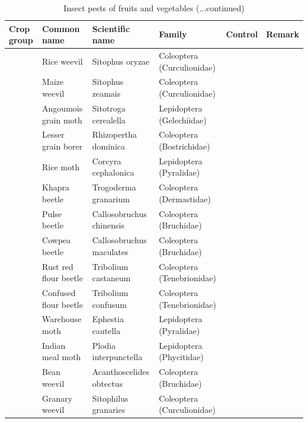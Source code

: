 \documentclass[10pt,dvipsnames,ignorenonframetext,aspectratio=169]{beamer}
\begin{document}
\begin{frame}{}
\protect\hypertarget{section-22}{}
\begin{table}

\caption{\label{tab:unnamed-chunk-4}Insect pests of fruits and vegetables (...continued)}
\centering
\fontsize{5}{7}\selectfont
\begin{tabular}[t]{>{\raggedright\arraybackslash}p{6em}>{\raggedright\arraybackslash}p{12em}>{\raggedright\arraybackslash}p{14em}>{\raggedright\arraybackslash}p{14em}>{\raggedright\arraybackslash}p{8em}>{\raggedright\arraybackslash}p{8em}}
\toprule
Crop group & Common name & Scientific name & Family & Control & Remark\\
\midrule
 & Rice weevil & Sitophus oryzae & Coleoptera (Curculionidae) &  & \\
\cmidrule{2-6}
 & Maize weevil & Sitophus zeamais & Coleoptera (Curculionidae) &  & \\
\cmidrule{2-6}
 & Angoumois grain moth & Sitotroga cerealella & Lepidoptera (Gelechiidae) &  & \\
\cmidrule{2-6}
 & Lesser grain borer & Rhizopertha dominica & Coleoptera (Bostrichidae) &  & \\
\cmidrule{2-6}
 & Rice moth & Corcyra cephalonica & Lepidoptera (Pyralidae) &  & \\
\cmidrule{2-6}
 & Khapra beetle & Trogoderma granarium & Coleoptera (Dermastidae) &  & \\
\cmidrule{2-6}
 & Pulse beetle & Callosobruchus chinensis & Coleoptera (Bruchidae) &  & \\
\cmidrule{2-6}
 & Cowpea beetle & Callosobruchus maculates & Coleoptera (Bruchidae) &  & \\
\cmidrule{2-6}
 & Rust red flour beetle & Tribolium castaneum & Coleoptera (Tenebrionidae) &  & \\
\cmidrule{2-6}
 & Confused flour beetle & Tribolium confusum & Coleoptera (Tenebrionidae) &  & \\
\cmidrule{2-6}
 & Warehouse moth & Ephestia cautella & Lepidoptera (Pyralidae) &  & \\
\cmidrule{2-6}
 & Indian meal moth & Plodia interpunctella & Lepidoptera (Phycitidae) &  & \\
\cmidrule{2-6}
 & Bean weevil & Acanthoscelides obtectus & Coleoptera (Bruchidae) &  & \\
\cmidrule{2-6}
\multirow{-14}{6em}{\raggedright\arraybackslash Storage pests} & Granary weevil & Sitophilus granaries & Coleoptera (Curculionidae) &  & \\
\bottomrule
\end{tabular}
\end{table}
\end{frame}
\end{document}
